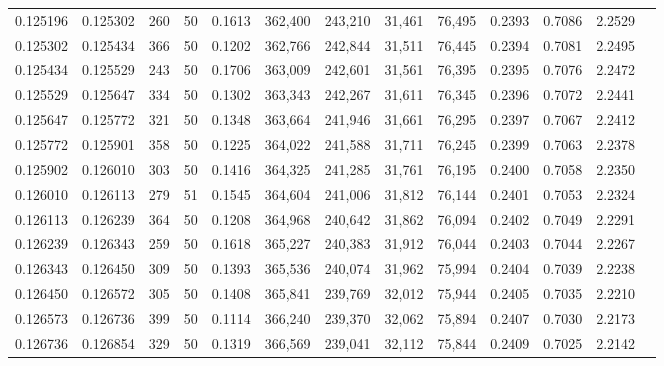 \begin{tabular}{rrrrrrrrrrrrr}
0.125196 & 0.125302 &   260 &  50 &                                     0.1613 & 362,400 & 243,210 &  31,461 &  76,495 & 0.2393 & 0.7086 & 2.2529 \\
0.125302 & 0.125434 &   366 &  50 &                                     0.1202 & 362,766 & 242,844 &  31,511 &  76,445 & 0.2394 & 0.7081 & 2.2495 \\
0.125434 & 0.125529 &   243 &  50 &                                     0.1706 & 363,009 & 242,601 &  31,561 &  76,395 & 0.2395 & 0.7076 & 2.2472 \\
0.125529 & 0.125647 &   334 &  50 &                                     0.1302 & 363,343 & 242,267 &  31,611 &  76,345 & 0.2396 & 0.7072 & 2.2441 \\
0.125647 & 0.125772 &   321 &  50 &                                     0.1348 & 363,664 & 241,946 &  31,661 &  76,295 & 0.2397 & 0.7067 & 2.2412 \\
0.125772 & 0.125901 &   358 &  50 &                                     0.1225 & 364,022 & 241,588 &  31,711 &  76,245 & 0.2399 & 0.7063 & 2.2378 \\
0.125902 & 0.126010 &   303 &  50 &                                     0.1416 & 364,325 & 241,285 &  31,761 &  76,195 & 0.2400 & 0.7058 & 2.2350 \\
0.126010 & 0.126113 &   279 &  51 &                                     0.1545 & 364,604 & 241,006 &  31,812 &  76,144 & 0.2401 & 0.7053 & 2.2324 \\
0.126113 & 0.126239 &   364 &  50 &                                     0.1208 & 364,968 & 240,642 &  31,862 &  76,094 & 0.2402 & 0.7049 & 2.2291 \\
0.126239 & 0.126343 &   259 &  50 &                                     0.1618 & 365,227 & 240,383 &  31,912 &  76,044 & 0.2403 & 0.7044 & 2.2267 \\
0.126343 & 0.126450 &   309 &  50 &                                     0.1393 & 365,536 & 240,074 &  31,962 &  75,994 & 0.2404 & 0.7039 & 2.2238 \\
0.126450 & 0.126572 &   305 &  50 &                                     0.1408 & 365,841 & 239,769 &  32,012 &  75,944 & 0.2405 & 0.7035 & 2.2210 \\
0.126573 & 0.126736 &   399 &  50 &                                     0.1114 & 366,240 & 239,370 &  32,062 &  75,894 & 0.2407 & 0.7030 & 2.2173 \\
0.126736 & 0.126854 &   329 &  50 &                                     0.1319 & 366,569 & 239,041 &  32,112 &  75,844 & 0.2409 & 0.7025 & 2.2142 \\

\end{tabular}

